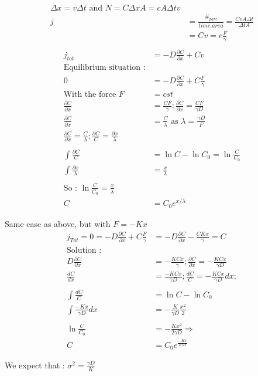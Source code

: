 \documentclass[10pt,a4paper]{article}
\begin{document}
\begin{align*}
    \Delta x = v\Delta t \text{ and } N = C\Delta x A = cA\Delta t v\\
    j &= \frac{\#_{part}}{time.area} = \frac{CvA\Delta t}{\Delta t A}\\
    &= Cv = c\frac{F}{\gamma}\\
\end{align*}
\begin{align*}
    j_{tot} &= -D \frac{\partial C}{\partial x} + Cv\\
    \text{Equilibrium situation :}\\
    0 &= -D\frac{\partial C}{\partial x} + C\frac{F}{\gamma}\\
    \text{With the force } F&=cst\\
    \frac{\partial C}{\partial x} &= \frac{CF}{\gamma} ; \frac{\partial C}{\partial x} = \frac{CF}{\gamma D}\\
    \frac{\partial C}{\partial x} &= \frac{C}{\lambda} \text{ as } \lambda = \frac{\gamma D}{F} \\
    \frac{\partial C}{\partial x} = \frac{C}{\lambda} ; \frac{\partial C}{C} = \frac{\partial x}{\lambda}\\
    ~~~\\
    \int \frac{\partial C}{C} &= \ln C - \ln C_0 = \ln \frac{C}{C_0}\\
    \int \frac{\partial x}{\lambda} &= \frac{x}{\lambda} \\
    ~~~\\
    \text{So : } \ln\frac{C}{C_0} = \frac{x}{\lambda}\\
    C &= C_0 e^{x/\lambda}
\end{align*}

Same case as above, but with $F = -Kx$\\
\begin{align*}
    j_{Tot} = 0 = -D\frac{\partial C}{\partial x} + C\frac{F}{\gamma} &= -D\frac{\partial C}{\partial x} - \frac{CKx}{\gamma} = C\\
    \text{Solution :}\\
    D\frac{\partial C}{\partial x} &= -\frac{KCx}{\gamma}; \frac{\partial C}{\partial x} = -\frac{KCx}{\gamma D}\\
    \frac{dC}{dx} &= \frac{-KCx}{\gamma D} ; \frac{dC}{C} = -\frac{KCx}{\gamma D}dx;\\
    ~~~~~\\
    \int \frac{dC}{C} &= \ln C - \ln C_0\\
    \int \frac{-Kx}{\gamma D}dx &= -\frac{K}{\gamma D}\frac{x^2}{2}\\
    ~~~~~\\
    \ln \frac{C}{C_0} &= -\frac{Kx^2}{2\gamma D} \Rightarrow \\
    C &= C_0 e^{\frac{-Kx}{2\gamma D}}
\end{align*}

We expect that : $ \sigma ^2 = \frac{\gamma D}{K}$
\end{document}
